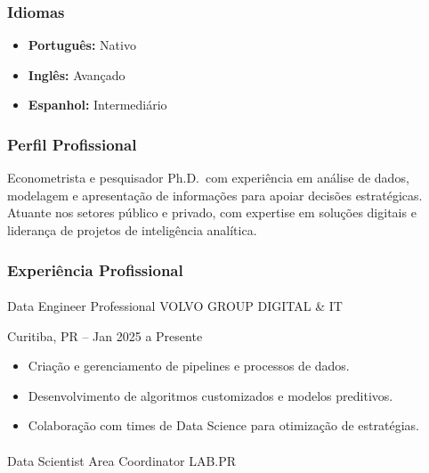 \documentclass[
  letterpaper,
  DIV=11,
  numbers=noendperiod]{scrartcl}
\makeatletter
\let\oldparagraph\paragraph
\renewcommand{\paragraph}{
    \@ifstar
      \xxxParagraphStar
      \xxxParagraphNoStar
  }
\newcommand{\xxxParagraphStar}[1]{\oldparagraph*{#1}\mbox{}}
\newcommand{\xxxParagraphNoStar}[1]{\oldparagraph{#1}\mbox{}}
\providecommand{\tightlist}{%
  \setlength{\itemsep}{0pt}\setlength{\parskip}{0pt}}\usepackage{longtable,booktabs,array}
\makeatother
\begin{document}
\subsubsection{Idiomas}\label{idiomas}

\begin{itemize}
\item
  \textbf{Português:} Nativo
\item
  \textbf{Inglês:} Avançado
\item
  \textbf{Espanhol:} Intermediário
\end{itemize}

\subsubsection{Perfil Profissional}\label{perfil-profissional}

Econometrista e pesquisador Ph.D.~com experiência em análise de dados,
modelagem e apresentação de informações para apoiar decisões
estratégicas. Atuante nos setores público e privado, com expertise em
soluções digitais e liderança de projetos de inteligência analítica.

\subsubsection{Experiência
Profissional}\label{experiuxeancia-profissional}

\paragraph{Data Engineer Professional \textbar{} VOLVO GROUP DIGITAL \&
IT}\label{data-engineer-professional-volvo-group-digital-it}

{Curitiba, PR -- Jan 2025 a Presente}

\begin{itemize}
\tightlist
\item
  Criação e gerenciamento de pipelines e processos de dados.
\item
  Desenvolvimento de algoritmos customizados e modelos preditivos.
\item
  Colaboração com times de Data Science para otimização de estratégias.
\end{itemize}

\paragraph{Data Scientist Area Coordinator \textbar{}
LAB.PR}\label{data-scientist-area-coordinator-lab.pr}
\end{document}
